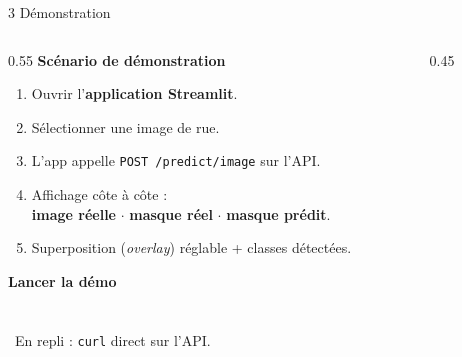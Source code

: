 \documentclass[aspectratio=169,11pt]{beamer}
\newcommand{\emphc}[1]{\textbf{\color{cvblue}#1}}
\newcommand{\code}[1]{\texttt{\small #1}}
\begin{document}
\begin{frame}{3 \textbar{} Démonstration}
  \begin{columns}[T]
    \begin{column}{0.55\textwidth}
      \textbf{Scénario de démonstration}
      \begin{enumerate}
        \item Ouvrir l'\emphc{application Streamlit}.
        \item Sélectionner une image de rue.
        \item L'app appelle \code{POST /predict/image} sur l'API.
        \item Affichage côte à côte :\\
          \emphc{image réelle} $\cdot$ \emphc{masque réel} $\cdot$ \emphc{masque prédit}.
        \item Superposition (\emph{overlay}) réglable + classes détectées.
      \end{enumerate}
      \vspace{0.4em}

      \textbf{\small Lancer la démo} \faLink\\[4pt]
      {\footnotesize
      \href{https://huggingface.co/spaces/DaryaEL/cityvision}{%
        }\\[3pt]
      \href{https://daryael-cityvision-api.hf.space/docs}{%
        }}
      \\[0.5em]
      {\scriptsize \faInfoCircle~En repli : \code{curl} direct sur l'API.}
    \end{column}
    \begin{column}{0.45\textwidth}
      \centering
    \end{column}
  \end{columns}
\end{frame}
\end{document}
